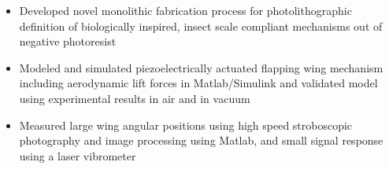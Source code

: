 	\begin{itemize}[leftmargin = \itemmargin]
	\item Developed novel monolithic fabrication process for photolithographic definition of biologically inspired, insect scale compliant mechanisms out of negative photoresist
	\item Modeled and simulated piezoelectrically actuated flapping wing mechanism including aerodynamic lift forces in Matlab/Simulink and validated model using experimental results in air and in vacuum
	\item Measured large wing angular positions using high speed stroboscopic photography and image processing using Matlab, and small signal response using a laser vibrometer
	\end{itemize} 
